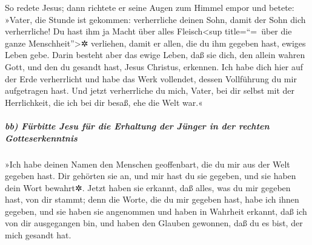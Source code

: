  So redete Jesus; dann richtete er seine Augen zum Himmel
empor und betete: »Vater, die Stunde ist gekommen: verherrliche deinen
Sohn, damit der Sohn dich verherrliche!  Du hast ihm ja
Macht über alles Fleisch\textless sup title=``=~über die ganze
Menschheit''\textgreater✲ verliehen, damit er allen, die du ihm gegeben
hast, ewiges Leben gebe.  Darin besteht aber das ewige
Leben, daß sie dich, den allein wahren Gott, und den du gesandt hast,
Jesus Christus, erkennen.  Ich habe dich hier auf der Erde
verherrlicht und habe das Werk vollendet, dessen Vollführung du mir
aufgetragen hast.  Und jetzt verherrliche du mich, Vater,
bei dir selbst mit der Herrlichkeit, die ich bei dir besaß, ehe die Welt
war.«

\hypertarget{bb-fuxfcrbitte-jesu-fuxfcr-die-erhaltung-der-juxfcnger-in-der-rechten-gotteserkenntnis}{%
\subparagraph{bb) Fürbitte Jesu für die Erhaltung der Jünger in der
rechten
Gotteserkenntnis}\label{bb-fuxfcrbitte-jesu-fuxfcr-die-erhaltung-der-juxfcnger-in-der-rechten-gotteserkenntnis}}

 »Ich habe deinen Namen den Menschen geoffenbart, die du
mir aus der Welt gegeben hast. Dir gehörten sie an, und mir hast du sie
gegeben, und sie haben dein Wort bewahrt✲.  Jetzt haben
sie erkannt, daß alles, was du mir gegeben hast, von dir stammt;
 denn die Worte, die du mir gegeben hast, habe ich ihnen
gegeben, und sie haben sie angenommen und haben in Wahrheit erkannt, daß
ich von dir ausgegangen bin, und haben den Glauben gewonnen, daß du es
bist, der mich gesandt hat.

